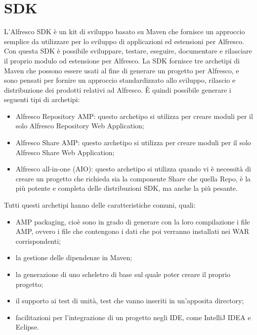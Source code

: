 \section{SDK}
L’Alfresco SDK è un kit di sviluppo basato su Maven che fornisce un approccio semplice
da utilizzare per lo sviluppo di applicazioni ed estensioni per Alfresco. Con questa SDK è
possibile sviluppare, testare, eseguire, documentare e rilasciare il proprio modulo od estensione per Alfresco. La SDK fornisce tre archetipi di Maven che possono essere
usati al fine di generare un progetto per Alfresco, e sono pensati per fornire un approccio standardizzato allo sviluppo, rilascio e distribuzione dei prodotti relativi ad Alfresco. È quindi possibile generare i
seguenti tipi di archetipi:
\begin{itemize}
\item Alfresco Repository AMP: questo archetipo si utilizza per creare moduli
per il solo Alfresco Repository Web Application;
\item Alfresco Share AMP: questo archetipo si utilizza per creare moduli per il solo
Alfresco Share Web Application;
\item Alfresco all-in-one (AIO): questo archetipo si utilizza quando vi è necessità di creare un progetto che richieda sia la componente Share che quella Repo, è la più potente e completa delle distribuzioni SDK, ma anche la più pesante.
\end{itemize}
Tutti questi archetipi hanno delle caratteristiche comuni, quali:
\begin{itemize}
\item AMP packaging, cioè sono in grado di generare con la loro compilazione i file AMP, ovvero i file che contengono i dati che poi verranno installati nei WAR corrispondenti;
\item la gestione delle dipendenze in Maven;
\item la generazione di uno scheletro di base sul quale poter creare il proprio progetto;
\item il supporto ai test di unità, test che vanno inseriti in un'apposita directory;
\item facilitazioni per l'integrazione di un progetto negli IDE, come IntelliJ IDEA e Eclipse.
\end{itemize}
